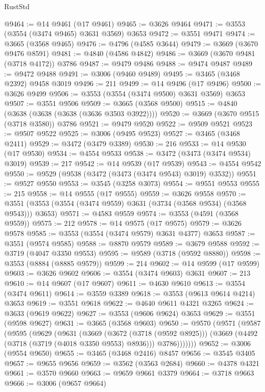 \begin{lexlean}{RustStd}
\begin{coremodule}
@9464 := @14 @9461 (@17 @9461)
@9465 := @3626 @9464
@9471 := @3553 (@3554 (@3474 @9465) @3631 @3569) @3653
@9472 := @3551 @9471
@9474 := @3665 (@3568 @9465)
@9476 := @4796 (@4585 @3644)
@9479 := @3669 (@3670 @9476 @8591)
@9481 := @4840 (@4586 @4842)
@9486 := @3669 (@3670 @9481 (@3718 @4172)) @3786
@9487 := @9479 @9486
@9488 := @9474 @9487
@9489 := @9472 @9488
@9491 := @3006 (@9460 @9489)
@9495 := @3465 (@3468 @2392) @9458 @3019
@9496 := 211
@9499 := @14 @9496 (@17 @9496)
@9500 := @3626 @9499
@9506 := @3553 (@3554 (@3474 @9500) @3631 @3569) @3653
@9507 := @3551 @9506
@9509 := @3665 (@3568 @9500)
@9515 := @4840 (@3638 (@3638 (@3638 (@3636 @3503 @3922))))
@9520 := @3669 (@3670 @9515 (@3718 @3580)) @3786
@9521 := @9479 @9520
@9522 := @9509 @9521
@9523 := @9507 @9522
@9525 := @3006 (@9495 @9523)
@9527 := @3465 (@3468 @2411)
@9529 := @3472 (@3479 @3389)
@9530 := 216
@9533 := @14 @9530 (@17 @9530)
@9534 := @4554 @9533
@9538 := @3472 (@3473 (@3474 @9534) @3019)
@9539 := 217
@9542 := @14 @9539 (@17 @9539)
@9543 := @4554 @9542
@9550 := @9529 (@9538 (@3472 (@3473 (@3474 @9543) @3019) @3532))
@9551 := @9527 @9550
@9553 := @3545 (@3258 @3073)
@9554 := @9551 @9553
@9555 := 215
@9558 := @14 @9555 (@17 @9555)
@9559 := @3626 @9558
@9570 := @3551 (@3553 (@3554 (@3474 @9559) @3631 (@3734 (@3568 @9534) (@3568 @9543))) @3653)
@9571 := @4583 @9559
@9574 := @3553 (@4591 (@3568 @9559))
@9575 := 212
@9578 := @14 @9575 (@17 @9575)
@9579 := @3626 @9578
@9585 := @3553 (@3554 (@3474 @9579) @3631 @4377) @3653
@9587 := @3551 (@9574 @9585)
@9588 := @8870 @9579
@9589 := @3679 @9588
@9592 := @3719 (@4047 @3350 @9553)
@9595 := @9589 (@3718 (@9592 @8880))
@9598 := @3553 (@8884 (@8885 @9579))
@9599 := 214
@9602 := @14 @9599 (@17 @9599)
@9603 := @3626 @9602
@9606 := @3554 (@3474 @9603) @3631
@9607 := 213
@9610 := @14 @9607 (@17 @9607)
@9611 := @4630 @9610
@9613 := @3554 (@3474 @9611)
@9614 := @3559 @3389
@9618 := @3553 (@9613 @9614 @4214) @3653
@9619 := @3551 @9618
@9622 := @4640 @9611 @4321 @3265
@9624 := @3633 (@9619 @9622)
@9627 := @3553 (@9606 @9624) @3653
@9629 := @3551 (@9598 @9627)
@9631 := @3665 (@3568 @9603)
@9650 := @9570
    (@9571
      (@9587
        (@9595
          (@9629
            (@9631
              (@3669
                (@3672 (@3718 (@9592 @8925)))
                (@3669 (@4492 (@3718 (@3719 (@4018 @3350 @9553) @8936))) @3786)))))))
@9652 := @3006 (@9554 @9650)
@9655 := @3465 (@3468 @2416) @8457
@9656 := @3545 @3405
@9657 := @9655 @9656
@9659 := @3562 (@3563 @2684)
@9660 := @4378 @4321
@9661 := @3570 @9660
@9663 := @9659 @9661 @3379
@9664 := @3718 @9663
@9666 := @3006 (@9657 @9664)

\end{coremodule}
\end{lexlean}
